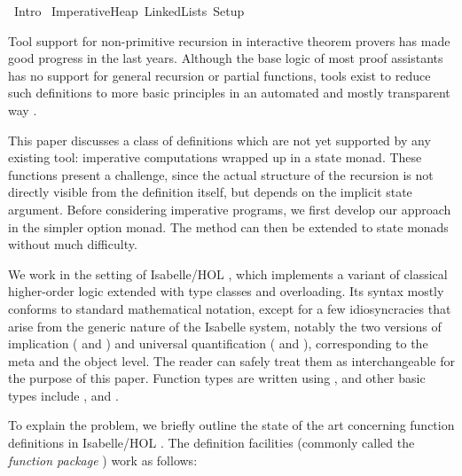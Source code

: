 \documentclass[copyright,creativecommons,sharealike]{eptcs}
\theoremstyle{remark}
\begin{document}
\begin{isabellebody}\def\isabellecontext{Intro}\isadelimtheory
\endisadelimtheory
\isatagtheory
{}\isamarkupfalse \ Intro\isanewline
{}\ Imperative{\isacharunderscore}Heap\ Linked{\isacharunderscore}Lists\ Setup\isanewline
{}\endisatagtheory
{\isafoldtheory}\isadelimtheory
\endisadelimtheory
{}
\isamarkuptrue \begin{isamarkuptext}Tool support for non-primitive recursion in interactive
theorem provers has made good progress in the last years. Although the
base logic of most proof assistants has no support for general
recursion or partial functions, tools exist to reduce such definitions
to more basic principles in an automated and mostly transparent way
\cite{wfrec,coqrecdef,Krauss09_funs,Bertot2008}.

This paper discusses a class of definitions which are not
yet supported by any existing tool: imperative computations wrapped up
  in a state monad.  These functions present a challenge, since the
actual structure of the recursion is not directly visible from the
definition itself, but depends on the implicit state argument.
Before considering imperative programs, we first develop our approach
in the simpler option monad. The method can then be extended to state monads
without much difficulty.\end{isamarkuptext}\isamarkuptrue {}
\isamarkuptrue \begin{isamarkuptext}We work in the
  setting of Isabelle/HOL \cite{tutorial}, which implements a variant
  of classical higher-order logic extended with type classes and
  overloading. Its syntax mostly conforms to standard mathematical
  notation, except for a few idiosyncracies that arise from the generic nature of the
  Isabelle system, notably the two versions of implication (\isa{{\isasymlongrightarrow}} and \isa{{\isasymLongrightarrow}}) and universal quantification (\isa{{\isasymforall}} and
  \isa{{\isasymAnd}}), corresponding to the meta and the object
  level. The reader can safely treat them as interchangeable for the
  purpose of this paper. Function types are written using \isa{{\isasymRightarrow}}, and
  other basic types include ,  and .\end{isamarkuptext}\isamarkuptrue {}
\isamarkuptrue \begin{isamarkuptext}To explain the problem, we briefly outline the state of the
  art concerning function definitions in Isabelle/HOL \cite{tutorial}. 
  The definition
  facilities (commonly called the \emph{function package} \cite{Krauss09_funs,krauss_phd})
  work as follows:


\end{isamarkuptext}
\end{isabellebody}
\end{document}
